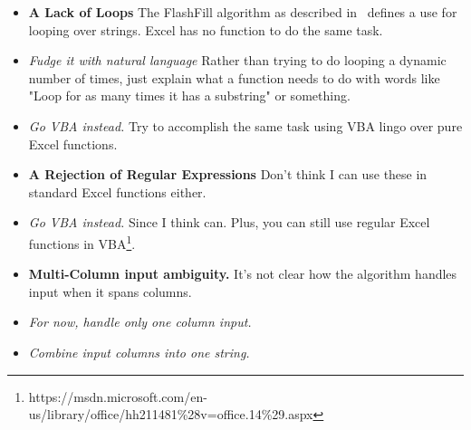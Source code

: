 \documentclass[11pt]{article} \usepackage{cite} \usepackage{marginnote}
\begin{document}
	\begin{itemize}
		\item[P1] \textbf{A Lack of Loops} The FlashFill algorithm as described in~\cite{gulwani2011automating} defines a use for looping over strings.
		Excel has no function to do the same task.
		
		\item[S1.1] \textit{Fudge it with natural language} Rather than trying
		to do looping a dynamic number of times, just explain what a function
		needs to do with words like "Loop for as many times it has a substring"
		or something.
		
		\item[S1.2] \textit{Go VBA instead.} Try to accomplish the same task
		using VBA lingo over pure Excel functions.
		
		\item[P2] \textbf{A Rejection of Regular Expressions} Don't think I can use these in standard Excel functions either.
		
		\item[S2.1] \textit{Go VBA instead.} Since I think can. Plus, you can still
		use regular Excel functions in VBA\footnote{https://msdn.microsoft.com/en-us/library/office/hh211481\%28v=office.14\%29.aspx}.
		
		\item[P3] \textbf{Multi-Column input ambiguity.} It's not clear how the algorithm
		handles input when it spans columns.
		
		\item[S3.1] \textit{For now, handle only one column input.}
		
		\item[S3.2] \textit{Combine input columns into one string.}
	\end{itemize}
	
	{} 
	
\end{document}
